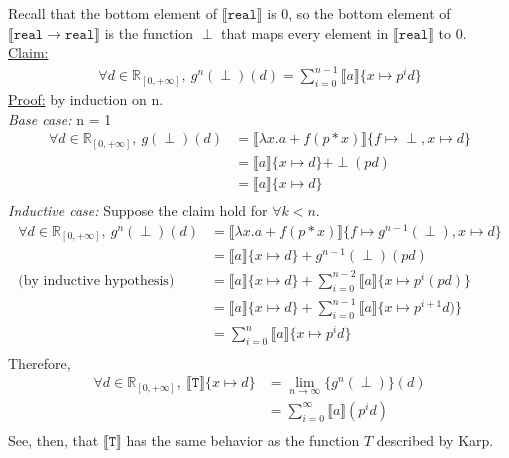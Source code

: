 \documentclass{westhesis}
\theoremstyle{plain}
\theoremstyle{definition}
\newcommand{\R}{\mathbb{R}}
\begin{document}
 Recall that the bottom element of $\llbracket \texttt{real} \rrbracket$ is $0$, so the bottom element of $\llbracket \texttt{real} 
 \rightarrow \texttt{real}\rrbracket$ is the function $\perp$ that maps every element in $\llbracket \texttt{real} \rrbracket$ to 
 $0$.  \\
 \underline{Claim:}
 \begin{align*}
 \forall d \in \R_{[0, +\infty]}, \ g^n(\perp)(d) = \sum_{i = 0}^{n-1}\llbracket a \rrbracket\{ x \mapsto p^{i}d\}
 \end{align*}
 \underline{Proof:} by induction on n. \\
 \emph{Base case:} n = 1
 \begin{align*}
 \forall d \in \R_{[0,+\infty]}, \ g(\perp)(d) &= \llbracket \lambda x.a + f(p*x)\rrbracket\{f \mapsto \perp, x \mapsto d\} \\
 &= \llbracket a \rrbracket\{x \mapsto d\} + \perp(pd) \\
 &= \llbracket a \rrbracket\{x \mapsto d\}  \\
 \end{align*}
 \emph{Inductive case:} Suppose the claim hold for $\forall k < n$.
 \begin{align*}
 \forall d \in \R_{[0,+\infty]}, \ g^n(\perp)(d) &= \llbracket \lambda x.a + f(p*x)\rrbracket\{f \mapsto g^{n-1}(\perp),x\mapsto d\} \\
 &= \llbracket a \rrbracket\{x \mapsto d\} + g^{n-1}(\perp)(pd) \\
\text{(by inductive hypothesis)} &= \llbracket a \rrbracket\{x \mapsto d\} 
					    + \sum_{i = 0}^{n-2}\llbracket a \rrbracket\{x \mapsto p^{i}(pd)\} \\
&= \llbracket a \rrbracket\{x \mapsto d\} + \sum_{i = 0}^{n-1}\llbracket a \rrbracket\{x \mapsto p^{i+1}d)\} \\
&= \sum_{i=0}^{n}\llbracket a \rrbracket\{x \mapsto p^{i}d\} \\
\end{align*}
Therefore, 
\begin{align*}
\forall d \in \R_{[0,+\infty]}, \ \llbracket \texttt{T} \rrbracket\{x \mapsto d\} &= \lim_{n \to \infty}\{g^n (\perp)\}(d) \\
&= \sum_{i=0}^{\infty} \llbracket a \rrbracket (p^{i}d) \\
 \end{align*}
 See, then, that $\llbracket \texttt{T} \rrbracket$ has the same behavior as the function $T$ described by Karp.
\end{document}
